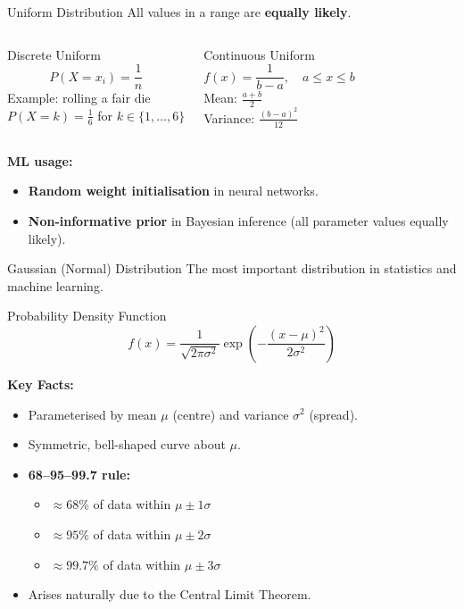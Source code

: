 \begin{frame}{Uniform Distribution}
All values in a range are \textbf{equally likely}.

\begin{columns}[T]
\begin{block}{Discrete Uniform}
\[
P(X = x_i) = \frac{1}{n}
\]
Example: rolling a fair die\\
$P(X=k)=\frac{1}{6}$ for $k \in \{1,\dots,6\}$
\end{block}
\begin{block}{Continuous Uniform}
\[
f(x) = \frac{1}{b-a}, \quad a \leq x \leq b
\]
Mean: $\frac{a+b}{2}$\\[4pt]
Variance: $\frac{(b-a)^2}{12}$
\end{block}
\end{columns}
\vspace{6pt}
\textbf{ML usage:}
\begin{itemize}
    \item \textbf{Random weight initialisation} in neural networks.
    \item \textbf{Non-informative prior} in Bayesian inference (all parameter values equally likely).
\end{itemize}
\end{frame}

\begin{frame}{Gaussian (Normal) Distribution}
The most important distribution in statistics and machine learning.
\begin{block}{Probability Density Function}
\[
f(x) = \frac{1}{\sqrt{2\pi\sigma^2}} \exp\!\left(-\frac{(x-\mu)^2}{2\sigma^2}\right)
\]
\end{block}
\textbf{Key Facts:}
\begin{itemize}
    \item Parameterised by mean $\mu$ (centre) and variance $\sigma^2$ (spread).
    \item Symmetric, bell-shaped curve about $\mu$.
    \item \textbf{68--95--99.7 rule:}
    \begin{itemize}
        \item $\approx 68\%$ of data within $\mu \pm 1\sigma$
        \item $\approx 95\%$ of data within $\mu \pm 2\sigma$
        \item $\approx 99.7\%$ of data within $\mu \pm 3\sigma$
    \end{itemize}
    \item Arises naturally due to the Central Limit Theorem.
\end{itemize}
\end{frame}

